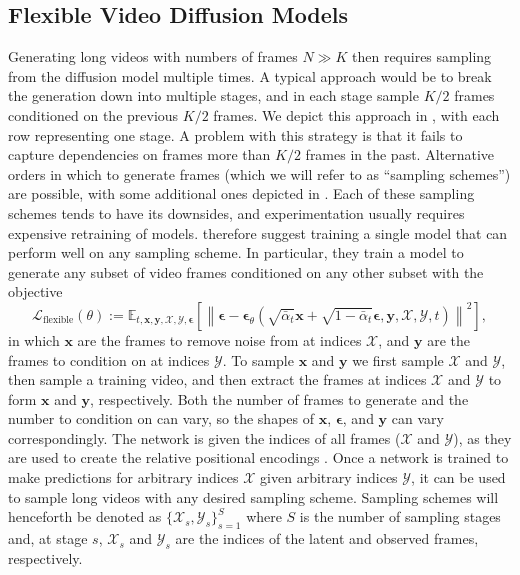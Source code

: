 \subsection{Flexible Video Diffusion Models}
Generating long videos with numbers of frames $N \gg K$ then requires sampling from the diffusion model multiple times. A typical approach would be to break the generation down into multiple stages, and in each stage sample $K/2$ frames conditioned on the previous $K/2$ frames. 
We depict this approach in , with each row representing one stage. A problem with this strategy is that it fails to capture dependencies on frames more than $K/2$ frames in the past. 
Alternative orders in which to generate frames (which we will refer to as ``sampling schemes'') are possible, with some additional ones depicted in . Each of these sampling schemes tends to have its downsides, and experimentation usually requires expensive retraining of models. 
\citet{fdm} therefore suggest training a single model that can perform well on any sampling scheme. In particular, they train a model to generate any subset of video frames conditioned on any other subset with the objective
\begin{equation}
    \mathcal{L}_{\text {flexible}}(\theta):=\mathbb{E}_{t, \mathbf{x}, \mathbf{y}, \mathcal{X}, \mathcal{Y}, \boldsymbol{\epsilon}}\left[\left\|\boldsymbol{\epsilon}-\boldsymbol{\epsilon}_\theta\left(\sqrt{\bar{\alpha}_t} \mathbf{x}+\sqrt{1-\bar{\alpha}_t} \boldsymbol{\epsilon}, \mathbf{y}, \mathcal{X}, \mathcal{Y}, t\right)\right\|^2\right],
    \label{eq:lflexible}
\end{equation}
in which $\mathbf{x}$ are the frames to remove noise from at indices $\mathcal{X}$, and $\mathbf{y}$ are the frames to condition on at indices $\mathcal{Y}$. 
To sample $\mathbf{x}$ and $\mathbf{y}$ we first sample $\mathcal{X}$ and $\mathcal{Y}$, then sample a training video, and then extract the frames at indices $\mathcal{X}$ and $\mathcal{Y}$ to form $\mathbf{x}$ and $\mathbf{y}$, respectively.
Both the number of frames to generate and the number to condition on can vary, so the shapes of $\mathbf{x}$, $\boldsymbol{\epsilon}$, and $\mathbf{y}$ can vary correspondingly. The network is given the indices of all frames ($\mathcal{X}$ and $\mathcal{Y}$), as they are used to create the relative positional encodings \citep{rpe1, rpe2}. 
Once a network is trained to make predictions for arbitrary indices $\mathcal{X}$ given arbitrary indices $\mathcal{Y}$, it can be used to sample long videos with any desired sampling scheme. Sampling schemes will henceforth be denoted as $\{\mathcal{X}_s, \mathcal{Y}_s\}_{s=1}^S$ where $S$ is the number of sampling stages and, at stage $s$, $\mathcal{X}_s$ and $\mathcal{Y}_s$ are the indices of the latent and observed frames, respectively. 











